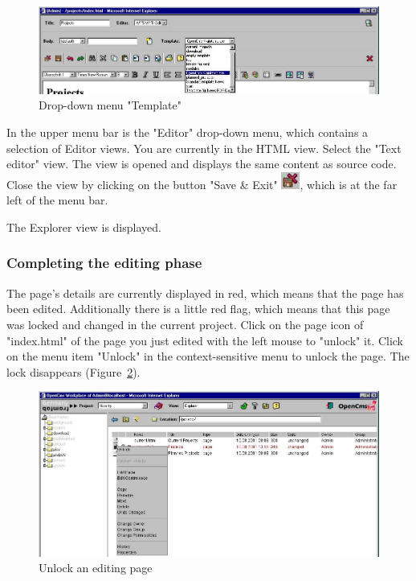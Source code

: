 \begin{figure}[hbt]
\begin{center}
\includegraphics[width=\sgw]
                   {pics/usermanual/selectTemplate}
\caption[Drop-down menu "Template"]
           {Drop-down menu "Template"}
\label{selecttemplate}
\end{center}
\end{figure}

In the upper menu bar is the "Editor" drop-down menu, which
contains a selection of Editor views. You are currently in the
HTML view. Select the "Text editor" view. The view is opened and
displays the same content as source code. Close the view by
clicking on the button "Save \& Exit"
\includegraphics{pics/usermanual/ic_saveexit}, which is at the far
left of the menu bar.

The Explorer view is displayed.

\subsubsection{Completing the editing phase}

The page's details are currently displayed in red, which means
that the page has been edited. Additionally there is a little red
flag, which means that this page was locked and changed in the
current project. Click on the page icon of "index.html" of the
page you just edited with the left mouse to "unlock" it. Click on
the menu item "Unlock" in the context-sensitive menu to unlock the
page. The lock disappears (Figure~\ref{unlockpage}).

\begin{figure}[hbt]
\begin{center}
\includegraphics[width=\sgw]
                   {pics/usermanual/unlockPage}
\caption[Unlock an editing page]
           {Unlock an editing page}
\label{unlockpage}
\end{center}
\end{figure}

